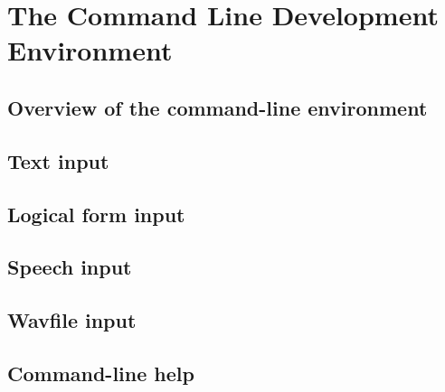 \chapter{The Command Line Development Environment}
\label{Chapter:CommandLineEnvironment}

\author{Manny Rayner}

\section{Overview of the command-line environment}
\label{Section:CommandLineOverview}

\section{Text input}
\label{Section:CommandLineTextInput}

\section{Logical form input}
\label{Section:CommandLineLFInput}

\section{Speech input}
\label{Section:CommandLineSpeechInput}

\section{Wavfile input}
\label{Section:CommandLineWavfileInput}

\section{Command-line help}
\label{Section:CommandLineHelp}
